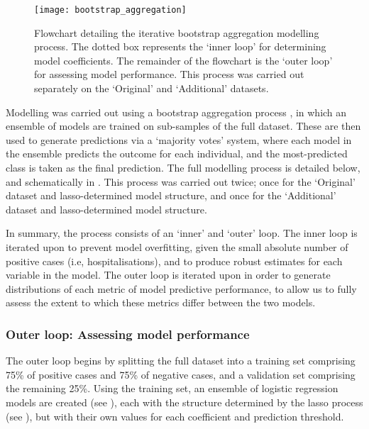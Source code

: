 \begin{figure}[h]
    \centering
    \texttt{[image: bootstrap\_aggregation]}
    \caption{Flowchart detailing the iterative bootstrap aggregation modelling process. The dotted box represents the `inner loop' for determining model coefficients. The remainder of the flowchart is the `outer loop' for assessing model performance. This process was carried out separately on the `Original' and `Additional' datasets.}
    \label{fig:bagging-flowchart}
\end{figure}

Modelling was carried out using a bootstrap aggregation process \cite{Hothorn2003}, in which an ensemble of models are trained on sub-samples of the full dataset. These are then used to generate predictions via a `majority votes' system, where each model in the ensemble predicts the outcome for each individual, and the most-predicted class is taken as the final prediction.
The full modelling process is detailed below, and schematically in . This process was carried out twice; once for the `Original' dataset and lasso-determined model structure, and once for the `Additional' dataset and lasso-determined model structure.

In summary, the process consists of an `inner' and `outer' loop.
The inner loop is iterated upon to prevent model overfitting, given the small absolute number of positive cases (i.e, hospitalisations), and to produce robust estimates for each variable in the model.
The outer loop is iterated upon in order to generate distributions of each metric of model predictive performance, to allow us to fully assess the extent to which these metrics differ between the two models.

\subsubsection{Outer loop: Assessing model performance}
\label{sec:additional-model-performance}

The outer loop begins by splitting the full dataset into a training set comprising 75\% of positive cases and 75\% of negative cases, and a validation set comprising the remaining 25\%. Using the training set, an ensemble of logistic regression models are created (see ), each with the structure determined by the lasso process (see ), but with their own values for each coefficient and prediction threshold.

